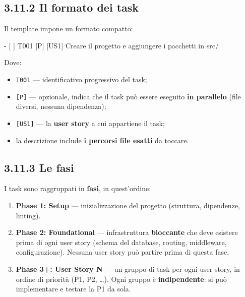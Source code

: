 \documentclass[
  italian,
  10pt,
]{book}
\newenvironment{Shaded}{\begin{snugshade}}{\end{snugshade}}
\newcommand{\NormalTok}[1]{#1}
\providecommand{\tightlist}{%
  \setlength{\itemsep}{0pt}\setlength{\parskip}{0pt}}
\begin{document}
\subsection{3.11.2 Il formato dei task}\label{il-formato-dei-task}

Il template impone un formato compatto:

\begin{Shaded}
\begin{Highlighting}[]
\NormalTok{{-} [ ] T001 [P] [US1] Creare il progetto e aggiungere i pacchetti in src/}
\end{Highlighting}
\end{Shaded}

Dove:

\begin{itemize}
\tightlist
\item
  \texttt{T001} --- identificativo progressivo del task;
\item
  \texttt{{[}P{]}} --- opzionale, indica che il task può essere eseguito
  \textbf{in parallelo} (file diversi, nessuna dipendenza);
\item
  \texttt{{[}US1{]}} --- la \textbf{user story} a cui appartiene il
  task;
\item
  la descrizione include \textbf{i percorsi file esatti} da toccare.
\end{itemize}

\subsection{3.11.3 Le fasi}\label{le-fasi}

I task sono raggruppati in \textbf{fasi}, in quest'ordine:

\begin{enumerate}
\def\labelenumi{\arabic{enumi}.}
\tightlist
\item
  \textbf{Phase 1: Setup} --- inizializzazione del progetto (struttura,
  dipendenze, linting).
\item
  \textbf{Phase 2: Foundational} --- infrastruttura \textbf{bloccante}
  che deve esistere prima di ogni user story (schema del database,
  routing, middleware, configurazione). Nessuna user story può partire
  prima di questa fase.
\item
  \textbf{Phase 3+: User Story N} --- un gruppo di task per ogni user
  story, in ordine di priorità (P1, P2, \ldots). Ogni gruppo è
  \textbf{indipendente}: si può implementare e testare la P1 da sola.
\end{enumerate}
\end{document}

